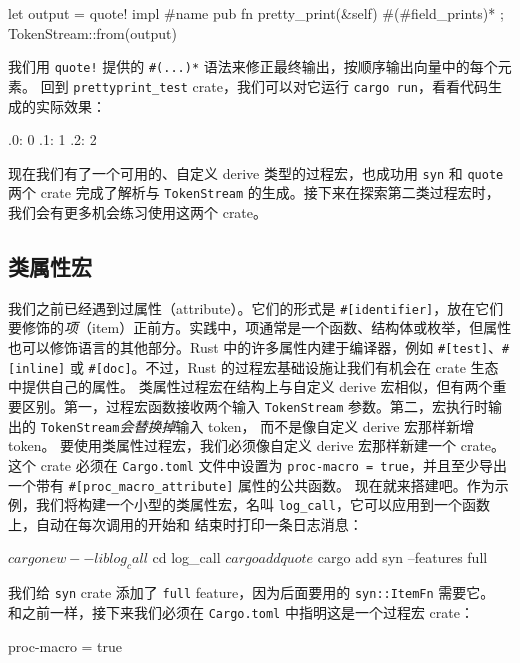 \begin{codebox}[rust]
let output = quote! {
    impl #name {
        pub fn pretty_print(&self) {
        #(#field_prints)*
        }
    }
};
TokenStream::from(output)
\end{codebox}
我们用 \texttt{quote!} 提供的 \texttt{\#(...)*} 语法来修正最终输出，按顺序输出向量中的每个元素。
回到 \texttt{prettyprint\_\allowbreak{}test} crate，我们可以对它运行 \texttt{cargo run}，看看代码生成的实际效果：
\begin{codeboxdark}
 .0: 0
 .1: 1
 .2: 2
\end{codeboxdark}
\label{idx:idx_cfd38f88}
现在我们有了一个可用的、自定义 derive 类型的过程宏，也成功用 \texttt{syn} 和 \texttt{quote} 两个 crate 完成了解析与 \texttt{TokenStream} 的生成。接下来在探索第二类过程宏时，我们会有更多机会练习使用这两个 crate。
\subsection{类属性宏}
\label{idx:idx_914c7221}
\label{idx:idx_71645113}
我们之前已经遇到过属性（attribute）。它们的形式是 \texttt{\#[\allowbreak{}identifier]\allowbreak{}}，放在它们要修饰的\emph{项}（item）正前方。实践中，项通常是一个函数、结构体或枚举，但属性也可以修饰语言的其他部分。Rust 中的许多属性内建于编译器，例如 \texttt{\#[test]}、\texttt{\#[inline]} 或 \texttt{\#[doc]}。不过，Rust 的过程宏基础设施让我们有机会在 crate 生态中提供自己的属性。
类属性过程宏在结构上与自定义 derive 宏相似，但有两个重要区别。第一，过程宏函数接收两个输入
\texttt{TokenStream} 参数。第二，宏执行时输出的 \texttt{TokenStream}\emph{会替换掉}输入 token，
而不是像自定义 derive 宏那样新增 token。
要使用类属性过程宏，我们必须像自定义 derive 宏那样新建一个 crate。这个 crate 必须在 \texttt{Cargo.toml} 文件中设置为 \texttt{proc-\allowbreak{}macro =\allowbreak{} true}，并且至少导出一个带有 \texttt{\#[\allowbreak{}proc\_\allowbreak{}macro\_\allowbreak{}attribute]\allowbreak{}} 属性的公共函数。
现在就来搭建吧。作为示例，我们将构建一个小型的类属性宏，名叫
\texttt{log\_call}，它可以应用到一个函数上，自动在每次调用的开始和
结束时打印一条日志消息：
\begin{codeboxdark}
$ cargo new --lib log_call
$ cd log_call
$ cargo add quote
$ cargo add syn --features full
\end{codeboxdark}
我们给 \texttt{syn} crate 添加了 \texttt{full} feature，因为后面要用的 \texttt{syn::ItemFn} 需要它。
\label{idx:idx_e004a75f}
\label{idx:idx_17f9af94}
和之前一样，接下来我们必须在 \texttt{Cargo.toml} 中指明这是一个过程宏 crate：
\begin{codeboxdark}
[lib]
proc-macro = true
\end{codeboxdark}
